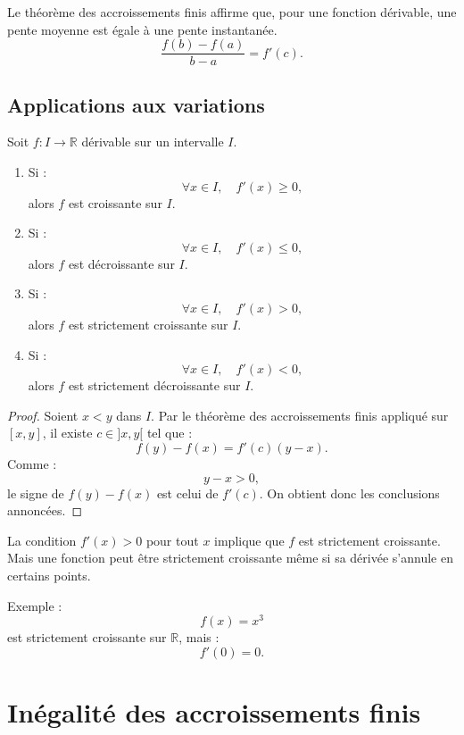 \documentclass[11pt,a4paper]{article}
\newcommand{\R}{\mathbb R}
\begin{document}
\begin{retenirbox}
Le théorème des accroissements finis affirme que, pour une fonction dérivable, une pente moyenne est égale à une pente instantanée.
\[
\frac{f(b)-f(a)}{b-a}=f'(c).
\]
\end{retenirbox}

\subsection{Applications aux variations}

\begin{theorembox}
Soit \(f:I\to\R\) dérivable sur un intervalle \(I\).
\begin{enumerate}
    \item Si :
    \[
    \forall x\in I,\quad f'(x)\geq0,
    \]
    alors \(f\) est croissante sur \(I\).
    \item Si :
    \[
    \forall x\in I,\quad f'(x)\leq0,
    \]
    alors \(f\) est décroissante sur \(I\).
    \item Si :
    \[
    \forall x\in I,\quad f'(x)>0,
    \]
    alors \(f\) est strictement croissante sur \(I\).
    \item Si :
    \[
    \forall x\in I,\quad f'(x)<0,
    \]
    alors \(f\) est strictement décroissante sur \(I\).
\end{enumerate}
\end{theorembox}

\begin{proof}
Soient \(x<y\) dans \(I\).  
Par le théorème des accroissements finis appliqué sur \([x,y]\), il existe \(c\in]x,y[\) tel que :
\[
f(y)-f(x)=f'(c)(y-x).
\]
Comme :
\[
y-x>0,
\]
le signe de \(f(y)-f(x)\) est celui de \(f'(c)\).  
On obtient donc les conclusions annoncées.
\end{proof}

\begin{erreurbox}
La condition \(f'(x)>0\) pour tout \(x\) implique que \(f\) est strictement croissante.  
Mais une fonction peut être strictement croissante même si sa dérivée s'annule en certains points.

Exemple :
\[
f(x)=x^3
\]
est strictement croissante sur \(\R\), mais :
\[
f'(0)=0.
\]
\end{erreurbox}

\section{Inégalité des accroissements finis}
\end{document}
